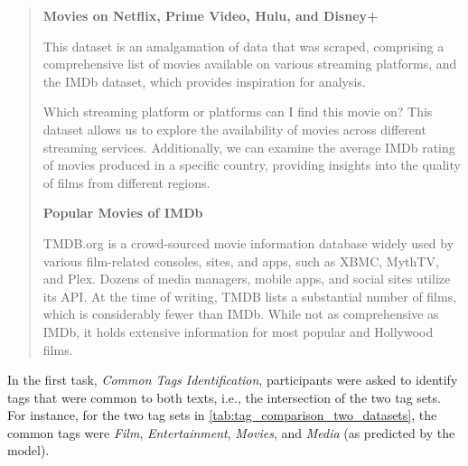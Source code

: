 \begin{quote}
    \textbf{Movies on Netflix, Prime Video, Hulu, and Disney+}

    This dataset is an amalgamation of data that was scraped, comprising a comprehensive list of movies available on various streaming platforms, and the IMDb dataset, which provides inspiration for analysis.

    Which streaming platform or platforms can I find this movie on? This dataset allows us to explore the availability of movies across different streaming services. Additionally, we can examine the average IMDb rating of movies produced in a specific country, providing insights into the quality of films from different regions.

    \textbf{Popular Movies of IMDb}

    TMDB.org is a crowd-sourced movie information database widely used by various film-related consoles, sites, and apps, such as XBMC, MythTV, and Plex. Dozens of media managers, mobile apps, and social sites utilize its API. At the time of writing, TMDB lists a substantial number of films, which is considerably fewer than IMDb. While not as comprehensive as IMDb, it holds extensive information for most popular and Hollywood films.
\end{quote}

In the first task, \textit{Common Tags Identification}, participants were asked to identify tags that were common to both texts, i.e., the intersection of the two tag sets. For instance, for the two tag sets in \cref{tab:tag_comparison_two_datasets}, the common tags were \textit{Film}, \textit{Entertainment}, \textit{Movies}, and \textit{Media} (as predicted by the model).

